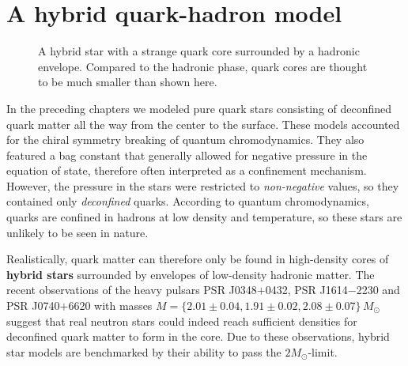 \chapter{A hybrid quark-hadron model}
\label{chap:hybrid}

\begin{figure}[th!]
\centering
{}
\caption{\label{fig:hybrid:illustration}%
	A hybrid star with a strange quark core surrounded by a hadronic envelope.
	Compared to the hadronic phase,
	quark cores are thought to be much smaller than shown here.
}
\end{figure}

In the preceding chapters we modeled pure quark stars
consisting of deconfined quark matter all the way from the center to the surface.
These models accounted for the chiral symmetry breaking of quantum chromodynamics.
They also featured a bag constant
that generally allowed for negative pressure in the equation of state,
therefore often interpreted as a confinement mechanism.
However, the pressure in the stars were restricted to \emph{non-negative} values,
so they contained only \emph{deconfined} quarks.
According to quantum chromodynamics,
quarks are confined in hadrons at low density and temperature,
so these stars are unlikely to be seen in nature.

\iffalse
To calculate the lower bag constant bound \eqref{eq:lsm:bag_lower_bound},
we even assumed that two-flavor quark matter is unstable compared to hadronic matter at zero pressure.
But the surface has zero pressure \emph{by definition},
so it is inconsistent that two-flavor quark matter exists there!
\fi

Realistically,
quark matter can therefore only be found in high-density cores of \textbf{hybrid stars}
surrounded by envelopes of low-density hadronic matter.
The recent observations \cite{ref:antoniadis,ref:arzoumanian,ref:fonseca}
of the heavy pulsars PSR J0348$+$0432, PSR J1614$-$2230 and PSR J0740$+$6620
with masses $M = \{2.01 \pm 0.04, 1.91 \pm 0.02, 2.08 \pm 0.07\} \, M_\odot$ 
suggest that real neutron stars could indeed reach sufficient densities
for deconfined quark matter to form in the core.
Due to these observations, hybrid star models are benchmarked by their ability to pass the $2 M_\odot$-limit.

